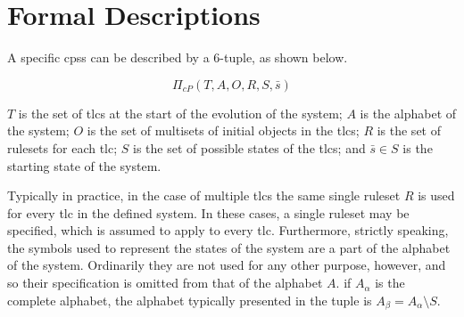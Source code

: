 \section{\label{sec:cps:formaldescriptions}Formal  Descriptions}

A specific \glspl{cps} can be described by a 6-tuple, as shown below.

\[
\Pi_{cP}(T, A, O, R, S, \bar{s})
\]

\(T\) is the set of \glspl{tlc} at the start of the evolution of the system; \(A\) is the alphabet of the system; \(O\) is the set of multisets of initial objects in the \glspl{tlc}; \(R\) is the set of \glspl{ruleset} for each \gls{tlc}; \(S\) is the set of possible states of the \glspl{tlc}; and \(\bar{s} \in S\) is the starting state of the system.

Typically in practice, in the case of multiple \glspl{tlc} the same single ruleset \(R\) is used for every \gls{tlc} in the defined system.  In these cases, a single ruleset may be specified, which is assumed to apply to every \gls{tlc}.  Furthermore, strictly speaking, the symbols used to represent the states of the system are a part of the alphabet of the system.  Ordinarily they are not used for any other purpose, however, and so their specification is omitted from that of the alphabet \(A\).  \Ie{} if \(A_\alpha\) is the complete alphabet, the alphabet typically presented in the tuple is \( A_\beta = A_\alpha \setminus S \).